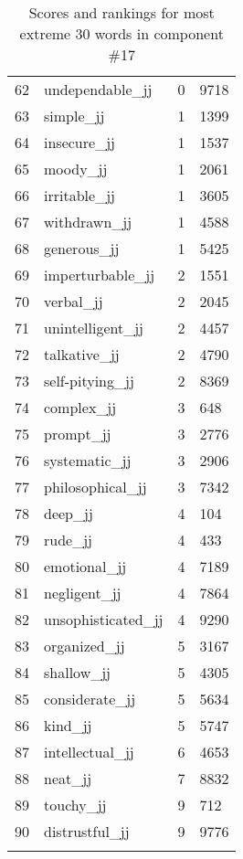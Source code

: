 \begin{longtable}[!htbp]{| rlr@{.}l |}
    62 & undependable\_jj & 0 & 9718 \\
    63 & simple\_jj & 1 & 1399 \\
    64 & insecure\_jj & 1 & 1537 \\
    65 & moody\_jj & 1 & 2061 \\
    66 & irritable\_jj & 1 & 3605 \\
    67 & withdrawn\_jj & 1 & 4588 \\
    68 & generous\_jj & 1 & 5425 \\
    69 & imperturbable\_jj & 2 & 1551 \\
    70 & verbal\_jj & 2 & 2045 \\
    71 & unintelligent\_jj & 2 & 4457 \\
    72 & talkative\_jj & 2 & 4790 \\
    73 & self-pitying\_jj & 2 & 8369 \\
    74 & complex\_jj & 3 & 648 \\
    75 & prompt\_jj & 3 & 2776 \\
    76 & systematic\_jj & 3 & 2906 \\
    77 & philosophical\_jj & 3 & 7342 \\
    78 & deep\_jj & 4 & 104 \\
    79 & rude\_jj & 4 & 433 \\
    80 & emotional\_jj & 4 & 7189 \\
    81 & negligent\_jj & 4 & 7864 \\
    82 & unsophisticated\_jj & 4 & 9290 \\
    83 & organized\_jj & 5 & 3167 \\
    84 & shallow\_jj & 5 & 4305 \\
    85 & considerate\_jj & 5 & 5634 \\
    86 & kind\_jj & 5 & 5747 \\
    87 & intellectual\_jj & 6 & 4653 \\
    88 & neat\_jj & 7 & 8832 \\
    89 & touchy\_jj & 9 & 712 \\
    90 & distrustful\_jj & 9 & 9776 \\
    \hline
    \caption{Scores and rankings for most extreme 30 words in component \#17} \\
\end{longtable}
